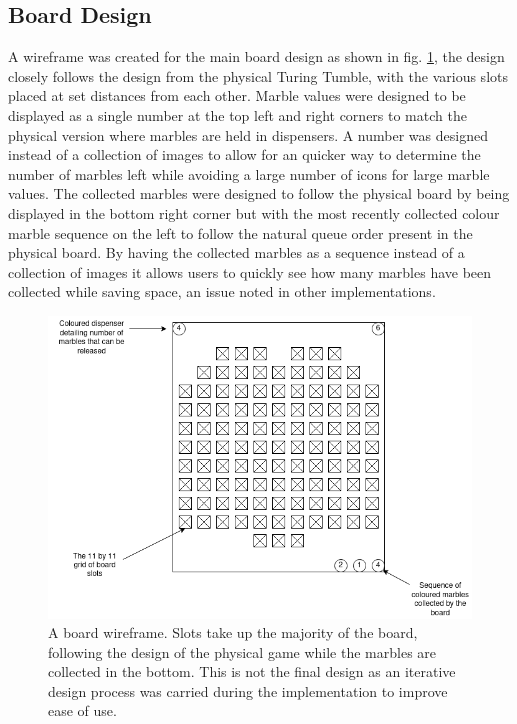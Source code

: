 \documentclass{l4proj}
\begin{document}
\subsection{Board Design}
A wireframe was created for the main board design as shown in fig. \ref{fig:boardWireframe}, the design closely follows the design from the physical Turing Tumble, with the various slots placed at set distances from each other. Marble values were designed to be displayed as a single number at the top left and right corners to match the physical version where marbles are held in dispensers. A number was designed instead of a collection of images to allow for an quicker way to determine the number of marbles left while avoiding a large number of icons for large marble values. The collected marbles were designed to follow the physical board by being displayed in the bottom right corner but with the most recently collected colour marble sequence on the left to follow the natural queue order present in the physical board. By having the collected marbles as a sequence instead of a collection of images it allows users to quickly see how many marbles have been collected while saving space, an issue noted in other implementations.

\begin{figure}
    \centering
    \includegraphics[width=0.7\linewidth]{images/boardWireframe.png}
    \caption{A board wireframe. Slots take up the majority of the board, following the design of the physical game while the marbles are collected in the bottom. This is not the final design as an iterative design process was carried during the implementation to improve ease of use.}
    \label{fig:boardWireframe}
\end{figure}
\end{document}
